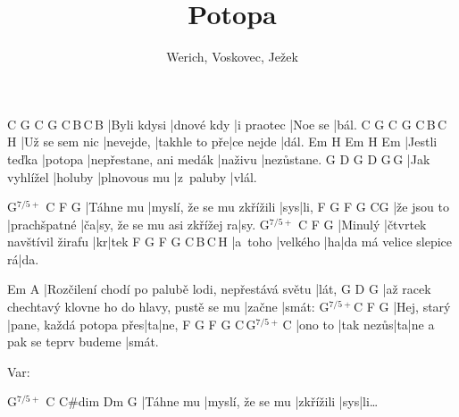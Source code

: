 \documentclass{song}
\title{Potopa}
\author{Werich, Voskovec, Ježek}
\newcommand{\aug}{$^{7/5+}$}
\begin{document}
\strophe
C           G\7        C          G\7     C\,B\7\,C\,B\7
|Byli kdysi |dnové kdy |i praotec |Noe se |bál.
C              G\7       C             G\7       C\,B\7\,C\,H\7
|Už se sem nic |nevejde, |takhle to pře|ce nejde |dál.
Em            H\7     Em                     H\7     Em
|Jestli teďka |potopa |nepřestane, ani medák |naživu |nezůstane.
G             D\7     G            D\7       G\,G\7
|Jak vyhlížel |holuby |plnovous mu |z~paluby |vlál.
\endstrophe

\strophe
{G\aug}     C                         F   G\7
|Táhne mu |myslí, že se mu zkřížili |sys|li,
F			G\7			 F	G\7						C\quad{}G\7
|že jsou to |prachšpatné |ča|sy, že se mu asi zkřížej ra|sy.
{G\aug} C                         F  G\7
|Minulý |čtvrtek navštívil žirafu |kr|tek
F       G\7      F  G\7                     C\,B\7\,C\,H\7
|a~toho |velkého |ha|da má velice slepice rá|da.
\endstrophe

\strophe
Em                                                A\7
|Rozčilení chodí po palubě lodi, nepřestává světu |lát,
G                                                   D\7    G
|až racek chechtavý klovne ho do hlavy, pustě se mu |začne |smát:
G\aug       C                       F  G\7
|Hej, starý |pane, každá potopa přes|ta|ne,
F       G\7       F  G\7                       C\,G\aug\,C
|ono to |tak nezůs|ta|ne a pak se teprv budeme |smát.
\endstrophe


Var:

\strophe
{G\aug}   C                C\#dim    Dm\7 G\7
|Táhne mu |myslí, že se mu |zkřížili |sys|li\ldots
\endstrophe
\end{document}
